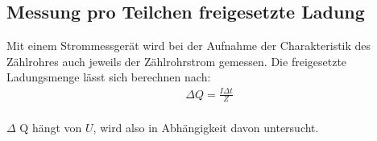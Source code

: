 \subsection{ Messung pro Teilchen freigesetzte Ladung}
Mit einem Strommessgerät wird bei der Aufnahme der Charakteristik des Zählrohres auch jeweils der Zählrohrstrom gemessen.
Die  freigesetzte Ladungsmenge lässt sich berechnen nach:\\
\begin{align}
\Delta Q=\frac{I \Delta t}{Z}
\label{ladungsmenge}
\end{align}\\
$\Delta$ Q hängt von $U$, wird also in Abhängigkeit davon untersucht.